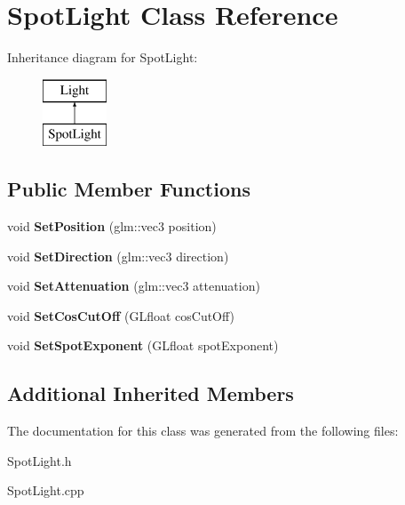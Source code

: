 \hypertarget{class_spot_light}{}\section{Spot\+Light Class Reference}
\label{class_spot_light}
Inheritance diagram for Spot\+Light\+:\begin{figure}[H]
\begin{center}
\leavevmode
\includegraphics[height=2.000000cm]{class_spot_light}
\end{center}
\end{figure}
\subsection*{Public Member Functions}
\begin{DoxyCompactItemize}
\item 
\mbox{\label{class_spot_light_a66a62acf516440ac717b4aa464c3c94a}} 
void {\bfseries Set\+Position} (glm\+::vec3 position)
\item 
\mbox{\label{class_spot_light_ac8239339ffa7dd31ea07a4cdcc36c4f4}} 
void {\bfseries Set\+Direction} (glm\+::vec3 direction)
\item 
\mbox{\label{class_spot_light_addcb3fc1007d25b33f4275ff16f26073}} 
void {\bfseries Set\+Attenuation} (glm\+::vec3 attenuation)
\item 
\mbox{\label{class_spot_light_ac7a4c2343ed2d8da4f2511d50318cb5f}} 
void {\bfseries Set\+Cos\+Cut\+Off} (G\+Lfloat cos\+Cut\+Off)
\item 
\mbox{\label{class_spot_light_aa45ba8d849a2a9a994f144c2610fa498}} 
void {\bfseries Set\+Spot\+Exponent} (G\+Lfloat spot\+Exponent)
\end{DoxyCompactItemize}
\subsection*{Additional Inherited Members}


The documentation for this class was generated from the following files\+:\begin{DoxyCompactItemize}
\item 
Spot\+Light.\+h\item 
Spot\+Light.\+cpp\end{DoxyCompactItemize}
